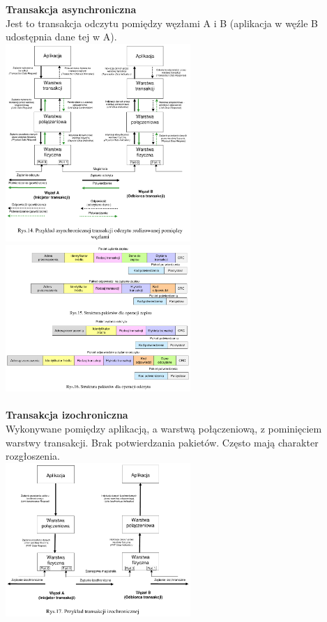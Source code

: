 	\textbf{Transakcja asynchroniczna}\\
	Jest to transakcja odczytu pomiędzy węzłami A i B (aplikacja w węźle B udostępnia dane tej w A).\\
	\includegraphics[width=7cm]{./wyklady/FIREWIRE_17_1.pdf}
	\includegraphics[width=7cm]{./wyklady/FIREWIRE_18_1.pdf}\\\\
	\textbf{Transakcja izochroniczna}\\
	Wykonywane pomiędzy aplikacją, a warstwą połączeniową, z pominięciem warstwy transakcji. Brak potwierdzania pakietów. Często mają charakter rozgłoszenia.\\
	\includegraphics[width=7cm]{./wyklady/FIREWIRE_19_1.pdf}\\\\
